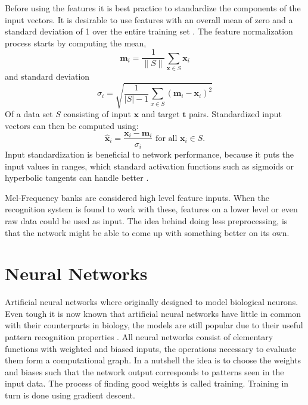 Before using the features it is best practice to standardize the components of the input vectors. It is desirable to use features with an overall mean of zero and a standard deviation of 1 over the entire training set \cite[page 30]{Graves2008}. The feature normalization process starts by computing the mean,
\begin{equation}
\mathbf{m}_i = \frac{1}{\|S\|} \sum\limits_{\mathbf{x} \in S} \mathbf{x}_i
\end{equation}
and standard deviation
\begin{equation}
\sigma_i = \sqrt{\frac{1}{|S| - 1}\sum\limits_{x \in S}(\mathbf{m}_i - \mathbf{x}_i)^2}
\end{equation}
Of a data set $S$ consisting of input $\mathbf{x}$ and target $\mathbf{t}$ pairs. Standardized input vectors can then be computed using:
\begin{equation}
\hat{\mathbf{x}}_i = \frac{\mathbf{x}_i - \mathbf{m}_i}{\sigma_i} \text{  for all } \mathbf{x}_i \in S.
\end{equation}
Input standardization is beneficial to network performance, because it puts the input values in ranges, which standard activation functions such as sigmoids or hyperbolic tangents can handle better \cite[page 30]{Graves2008}.

Mel-Frequency banks are considered high level feature inputs. When the recognition system is found to work with these, features on a lower level or even raw data could be used as input. The idea behind doing less preprocessing, is that the network might be able to come up with something better on its own.

\section{Neural Networks}
Artificial neural networks where originally designed to model biological neurons. Even tough it is now known that artificial neural networks have little in common with their counterparts in biology, the models are still popular due to their useful pattern recognition properties \cite[page 13]{Graves2008}. All neural networks consist of elementary functions with weighted and biased inputs, the operations necessary to evaluate them form a computational graph. In a nutshell the idea is to choose the weights and biases such that the network output corresponds to patterns seen in the input data. The process of finding good weights is called training. Training in turn is done using gradient descent.

